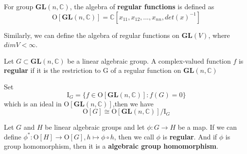\documentclass[12pt]{article}
\newenvironment{definition}[2][Definition]{\begin{trivlist}
\item[\hskip \labelsep {\bfseries #1}\hskip \labelsep {\bfseries #2.}]}{\end{trivlist}}
\begin{document}
\begin{definition}{2.1}
    For group $\mathbf{GL}(n,\mathbb{C})$, the algebra of \textbf{regular functions} is defined as$$\mathrm{O}[\mathbf{GL}(n,\mathbb{C})]=\mathbb{C}[x_{11},x_{12},...,x_{nn},det(x)^{-1}]$$
\end{definition}
Similarly, we can define the algebra of regular functions on $\mathbf{GL}(V)$, where $dimV<\infty$.

\begin{definition}{2.2}
    Let $G \subset \mathbf{GL}(n,\mathbb{C})$ be a linear algebraic group. A complex-valued function $f$ is \textbf{regular} if it is the restriction to G of a regular function on $\mathbf{GL}(n,\mathbb{C})$
\end{definition}
\vspace{1cm}
Set$$\mathrm{I}_{G}=\{f\in \mathrm{O}[\mathbf{GL}(n,\mathbb{C})]:f(G)= 0\}$$which is an ideal in $\mathrm{O}[\mathbf{GL}(n,\mathbb{C})]$,then we have$$\mathrm{O}[G] \cong \mathrm{O}[\mathbf{GL}(n,\mathbb{C})]/ \mathrm{I}_{G}$$

Let $G$ and $H$ be linear algebraic groups and let $\phi :G \to H$ be a map. If we can define $\phi^{*}:\mathrm{O}[H]\to\mathrm{O}[G],h\mapsto\phi\circ h$, then we call $\phi$ is \textbf{regular}. And if $\phi$ is group homomorphism, then it is a \textbf{algebraic group homomorphism}.\\
\end{document}
